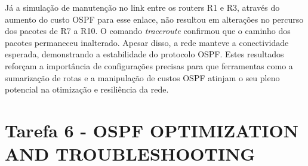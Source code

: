 \documentclass[11pt,english, openright, oneside]{book}
\begin{document}
\par Já a simulação de manutenção no link entre os routers R1 e R3, através do aumento do custo OSPF para esse enlace, não resultou em alterações no percurso dos pacotes de R7 a R10. O comando \textit{traceroute} confirmou que o caminho dos pacotes permaneceu inalterado. Apesar disso, a rede manteve a conectividade esperada, demonstrando a estabilidade do protocolo OSPF. Estes resultados reforçam a importância de configurações precisas para que ferramentas como a sumarização de rotas e a manipulação de custos OSPF atinjam o seu pleno potencial na otimização e resiliência da rede.

\pagebreak

\section{Tarefa 6 - OSPF OPTIMIZATION AND TROUBLESHOOTING}
\vspace{0.2cm}

\pagebreak

\mainmatter
\end{document}
